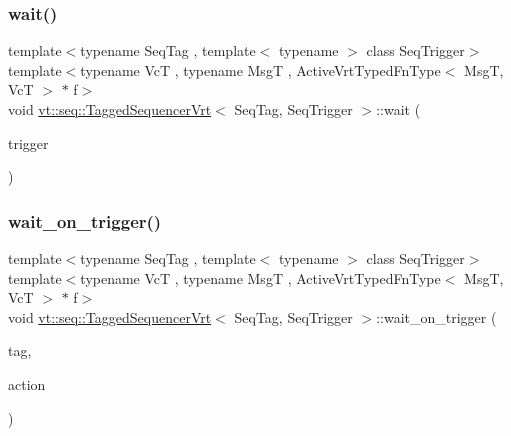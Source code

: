 \subsubsection{\texorpdfstring{wait()}{wait()}\hspace{0.1cm}{\footnotesize\ttfamily [2/2]}}
{\footnotesize\ttfamily template$<$typename Seq\+Tag , template$<$ typename $>$ class Seq\+Trigger$>$ \\
template$<$typename VcT , typename MsgT , Active\+Vrt\+Typed\+Fn\+Type$<$ Msg\+T, Vc\+T $>$ $\ast$ f$>$ \\
void \hyperlink{structvt_1_1seq_1_1_tagged_sequencer_vrt}{vt\+::seq\+::\+Tagged\+Sequencer\+Vrt}$<$ Seq\+Tag, Seq\+Trigger $>$\+::wait (\begin{DoxyParamCaption}\item[{\hyperlink{structvt_1_1seq_1_1_tagged_sequencer_a4b015f2f7d3197a66af5576f0e63a834}{Seq\+Trigger\+Type}$<$ MsgT, VcT $>$}]{trigger }\end{DoxyParamCaption})}

\mbox{\label{structvt_1_1seq_1_1_tagged_sequencer_vrt_a768f8c419f42b3dad84ebce3f046f0e9}} 
\subsubsection{\texorpdfstring{wait\+\_\+on\+\_\+trigger()}{wait\_on\_trigger()}}
{\footnotesize\ttfamily template$<$typename Seq\+Tag , template$<$ typename $>$ class Seq\+Trigger$>$ \\
template$<$typename VcT , typename MsgT , Active\+Vrt\+Typed\+Fn\+Type$<$ Msg\+T, Vc\+T $>$ $\ast$ f$>$ \\
void \hyperlink{structvt_1_1seq_1_1_tagged_sequencer_vrt}{vt\+::seq\+::\+Tagged\+Sequencer\+Vrt}$<$ Seq\+Tag, Seq\+Trigger $>$\+::wait\+\_\+on\+\_\+trigger (\begin{DoxyParamCaption}\item[{\hyperlink{namespacevt_a84ab281dae04a52a4b243d6bf62d0e52}{Tag\+Type} const \&}]{tag,  }\item[{\hyperlink{structvt_1_1seq_1_1_tagged_sequencer_a0210dbd34288d440e0cd51db9d6637bd}{Seq\+Action\+Type}$<$ MsgT, VcT $>$}]{action }\end{DoxyParamCaption})}



